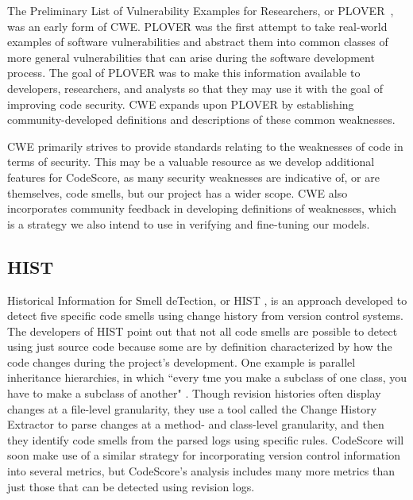 \documentclass{sig-alternate}
\begin{document}

The Preliminary List of Vulnerability Examples for Researchers, or PLOVER~\cite{christey2005plover},
was an early form of CWE. PLOVER was the first attempt
to take real-world examples of software vulnerabilities and abstract them into
common classes of more general vulnerabilities that can arise during the
software development process. The goal of PLOVER was to make this information
available to developers, researchers, and analysts so that they may use it with
the goal of improving code security. CWE expands upon PLOVER by establishing
community-developed definitions and descriptions of these common weaknesses.

CWE primarily strives to provide standards relating to the weaknesses of code in
terms of security. This may be a valuable resource as we develop additional features for
CodeScore, as many security weaknesses are indicative of, or are themselves, code 
smells, but our project has a wider scope. CWE also incorporates community feedback in
developing definitions of weaknesses, which is a strategy we also intend to use
in verifying and fine-tuning our models.

\subsection{HIST}
Historical Information for Smell deTection, or HIST \cite{palomba}, is an
approach developed to detect five specific code smells using change history from
version control systems.  The developers of HIST point out that not all code
smells are possible to detect using just source code because some are by
definition characterized by how the code changes during the project's
development. One example is parallel inheritance hierarchies, in which ``every
tme you make a subclass of one class, you have to make a subclass of another"
\cite{fowler1999}. Though revision histories often display changes at a
file-level granularity, they use a tool called the Change History Extractor to parse
changes at a method- and class-level granularity, and then they identify code 
smells from the parsed logs using specific rules. CodeScore will soon
make use of a similar strategy for incorporating version control information
into several metrics, but CodeScore's analysis includes many more metrics than just
those that can be detected using revision logs.
\end{document}
